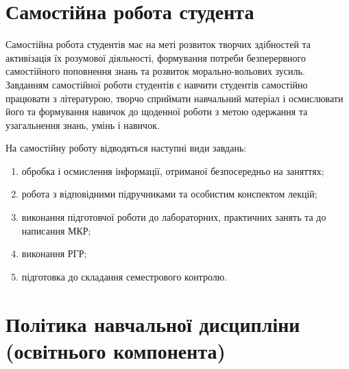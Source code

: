 \documentclass{Syllabus}
\begin{document}
\section{Самостійна робота студента}

Самостійна робота студентів має на меті розвиток творчих здібностей та активізація їх розумової діяльності, формування потреби безперервного самостійного поповнення знань та розвиток морально-вольових зусиль. Завданням самостійної роботи студентів є навчити студентів самостійно працювати з літературою, творчо сприймати навчальний матеріал і осмислювати його та формування навичок до щоденної роботи з метою одержання та узагальнення знань, умінь і навичок.


На самостійну роботу відводяться наступні види завдань:
\begin{enumerate}[label=$\bullet$]
\item обробка і осмислення інформації, отриманої безпосередньо на заняттях;
\item робота з відповідними підручниками та особистим конспектом лекцій;
\item виконання підготовчої роботи до лабораторних, практичних занять та до написання МКР;
\item виконання РГР;
\item підготовка до складання семестрового контролю.
\end{enumerate}

% 




\section{Політика навчальної дисципліни (освітнього компонента)}
\end{document}
